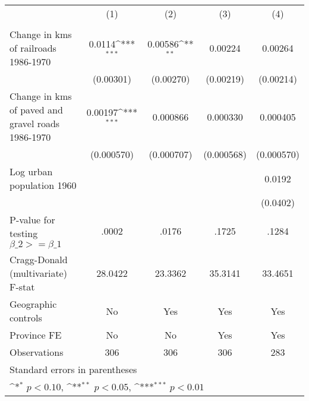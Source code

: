 {
\def\sym#1{\ifmmode^{#1}\else\(^{#1}\)\fi}
\begin{tabular}{l*{4}{c}}
\hline\hline
                &\multicolumn{1}{c}{(1)}&\multicolumn{1}{c}{(2)}&\multicolumn{1}{c}{(3)}&\multicolumn{1}{c}{(4)}\\
                &\multicolumn{1}{c}{}&\multicolumn{1}{c}{}&\multicolumn{1}{c}{}&\multicolumn{1}{c}{}\\
\hline
Change in kms of railroads 1986-1970&   0.0114\sym{***}&  0.00586\sym{**} &  0.00224         &  0.00264         \\
                &(0.00301)         &(0.00270)         &(0.00219)         &(0.00214)         \\
[1em]
Change in kms of paved and gravel roads 1986-1970&  0.00197\sym{***}& 0.000866         & 0.000330         & 0.000405         \\
                &(0.000570)         &(0.000707)         &(0.000568)         &(0.000570)         \\
[1em]
Log urban population 1960&                  &                  &                  &   0.0192         \\
                &                  &                  &                  & (0.0402)         \\
\hline
P-value for testing $\beta\_{2} >= \beta\_{1}$&    .0002         &    .0176         &    .1725         &    .1284         \\
Cragg-Donald (multivariate) F-stat&  28.0422         &  23.3362         &  35.3141         &  33.4651         \\
Geographic controls&       No         &      Yes         &      Yes         &      Yes         \\
Province FE     &       No         &       No         &      Yes         &      Yes         \\
Observations    &      306         &      306         &      306         &      283         \\
\hline\hline
\multicolumn{5}{l}{\footnotesize Standard errors in parentheses}\\
\multicolumn{5}{l}{\footnotesize \sym{*} \(p<0.10\), \sym{**} \(p<0.05\), \sym{***} \(p<0.01\)}\\
\end{tabular}
}
